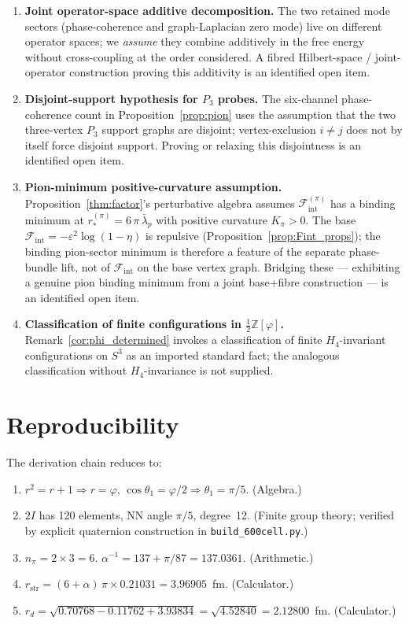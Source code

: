 \documentclass[12pt]{article}
\newcommand{\Fcal}{\mathcal{F}}
\newcommand{\Fint}{\Fcal_{\mathrm{int}}}
\newcommand{\phig}{\varphi}
\newcommand{\lbar}{\bar{\lambda}}
\begin{document}
\begin{enumerate}
    \item \textbf{Joint operator-space additive decomposition.} The two retained mode sectors (phase-coherence and graph-Laplacian zero mode) live on different operator spaces; we \emph{assume} they combine additively in the free energy without cross-coupling at the order considered. A fibred Hilbert-space / joint-operator construction proving this additivity is an identified open item.
    \item \textbf{Disjoint-support hypothesis for $P_3$ probes.} The six-channel phase-coherence count in Proposition~\ref{prop:pion} uses the assumption that the two three-vertex $P_3$ support graphs are disjoint; vertex-exclusion $i \neq j$ does not by itself force disjoint support. Proving or relaxing this disjointness is an identified open item.
    \item \textbf{Pion-minimum positive-curvature assumption.} Proposition~\ref{thm:factor}'s perturbative algebra assumes $\Fint^{(\pi)}$ has a binding minimum at $r_*^{(\pi)} = 6\,\pi\,\lbar_p$ with positive curvature $K_\pi > 0$. The base $\Fint = -\varepsilon^2\log(1-\eta)$ is repulsive (Proposition~\ref{prop:Fint_props}); the binding pion-sector minimum is therefore a feature of the separate phase-bundle lift, not of $\Fint$ on the base vertex graph. Bridging these --- exhibiting a genuine pion binding minimum from a joint base+fibre construction --- is an identified open item.
    \item \textbf{Classification of finite configurations in $\tfrac{1}{2}\mathbb{Z}[\phig]$.} Remark~\ref{cor:phi_determined} invokes a classification of finite $H_4$-invariant configurations on $S^3$ as an imported standard fact; the analogous classification without $H_4$-invariance is not supplied.
\end{enumerate}

\section{Reproducibility}\label{sec:reproducibility}

The derivation chain reduces to:
\begin{enumerate}
    \item $r^2 = r + 1 \Rightarrow r = \phig$, $\cos\theta_1 = \phig/2 \Rightarrow \theta_1 = \pi/5$. (Algebra.)
    \item $2I$ has 120 elements, NN angle $\pi/5$, degree~12. (Finite group theory; verified by explicit quaternion construction in \texttt{build\_600cell.py}.)
    \item $n_\pi = 2 \times 3 = 6$. $\alpha^{-1} = 137 + \pi/87 = 137.0361$. (Arithmetic.)
    \item $r_{\mathrm{str}} = (6 + \alpha)\,\pi \times 0.21031 = 3.96905$~fm. (Calculator.)
    \item $r_d = \sqrt{0.70768 - 0.11762 + 3.93834} = \sqrt{4.52840} = 2.12800$~fm. (Calculator.)
\end{enumerate}
\end{document}
